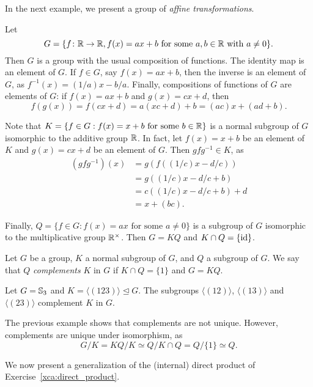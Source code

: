 In the next example, we present a group of \emph{affine transformations}. 

\begin{example}
\label{exa:affine}
    Let 
    \[ 
    G=\{f\colon\mathbb{R}\to\mathbb{R}, f(x)=ax+b\text{ for some $a,b\in\mathbb{R}$ with $a\ne 0$}\}.
    \]
    Then $G$ is a group with the usual composition of functions. The identity map is an element of $G$. 
    If $f\in G$, say $f(x)=ax+b$, then the inverse is an element of $G$, as 
    $f^{-1}(x)=(1/a)x-b/a$. Finally, compositions of functions of $G$ are elements of $G$: 
    if $f(x)=ax+b$ and $g(x)=cx+d$, then 
    \[
    f(g(x))=f(cx+d)=a(xc+d)+b=(ac)x+(ad+b).
    \]
    
    Note that $K=\{f\in G:f(x)=x+b\text{ for some $b\in\mathbb{R}$}\}$ is a normal subgroup 
    of $G$ isomorphic to the additive group $\mathbb{R}$. In fact, let $f(x)=x+b$ be an element of $K$ 
    and $g(x)=cx+d$ be an element of $G$. Then $gfg^{-1}\in K$, as 
    \begin{align*}
    (gfg^{-1})(x)&=g(f((1/c)x-d/c))\\
    &=g((1/c)x-d/c+b)\\
    &=c( (1/c)x-d/c+b)+d\\
    &=x+(bc).
    \end{align*}
    
    Finally, 
    $Q=\{f\in G:f(x)=ax\text{ for some $a\ne0$}\}$ is a subgroup of $G$ isomorphic to the multiplicative group $\mathbb{R}^{\times}$. 
    Then $G=KQ$ and $K\cap Q=\{\operatorname{id}\}$.
\end{example}

\begin{definition}
Let $G$ be a group, $K$ a normal subgroup of $G$, and $Q$ a subgroup of $G$. We say
that $Q$ \emph{complements} $K$ in $G$ if $K\cap Q=\{1\}$ and $G=KQ$.
\end{definition}

\begin{example}
Let $G=\mathbb{S}_3$ and $K=\langle (123)\rangle\unlhd G$. The subgroups
$\langle (12)\rangle$, $\langle
(13)\rangle$ and $\langle (23)\rangle$ complement $K$ in $G$.
\end{example}

The previous example shows that complements are not unique. However, 
complements are unique under isomorphism, as 
\[
G/K= KQ/K\simeq Q/K\cap Q=Q/\{1\}\simeq Q.
\]

We now present a generalization of the (internal) direct product of
Exercise~\ref{xca:direct_product}. 

